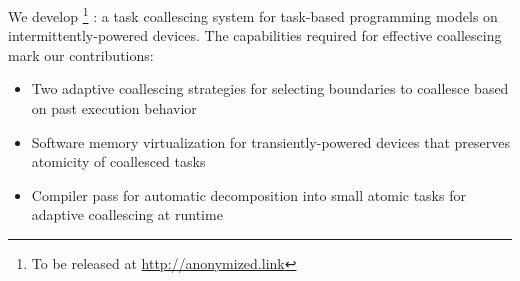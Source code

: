 We develop \sys%
\footnote{To be released at \url{http://anonymized.link}}
%
: a task coallescing system for task-based
programming models on intermittently-powered devices. The
capabilities required for effective coallescing mark our
contributions:

\begin{itemize}
\item Two adaptive coallescing strategies for selecting boundaries to coallesce based on past execution behavior
\item Software memory virtualization for transiently-powered devices that preserves atomicity of coallesced tasks
\item Compiler pass for automatic decomposition into small atomic tasks for adaptive coallescing at runtime
\end{itemize}





